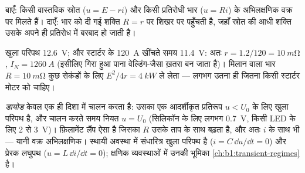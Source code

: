 \begin{omfigure}
\qquad
{}

{\small बाएँ: किसी वास्तविक स्रोत ($u = E - ri$) और किसी प्रतिरोधी भार
($u = Ri$) के अभिलक्षणिक वक्र  पर मिलते हैं। दाएँ: भार को दी गई
शक्ति $R = r$ पर शिखर पर पहुँचती है, जहाँ स्रोत की आधी शक्ति उसके अपने ही
प्रतिरोध में बरबाद हो जाती है।}
\end{omfigure}

\begin{example}[भार के नीचे कार की बैटरी]\label{ex:b1:dc-circuits:battery}
खुला परिपथ \qty{12.6}{V}; और स्टार्टर के \qty{120}{A} खींचते समय
\qty{11.4}{V}: अतः $r = 1.2/120 = \qty{10}{m\ohm}$, $I_N = \qty{1260}{A}$
(इसीलिए गिरा हुआ पाना वेल्डिंग-जैसा ख़तरा बन जाता है)। मिलान वाला भार
$R = \qty{10}{m\ohm}$ कुछ सेकंडों के लिए $E^2/4r = \qty{4}{kW}$ ले लेता
--- लगभग उतना ही जितना किसी स्टार्टर मोटर को चाहिए।
\end{example}

\begin{remark}[अन्य द्विसिरा]\label{rem:b1:dc-circuits:others}
\emph{डायोड} केवल एक ही दिशा में चालन करता है: उसका एक आदर्शीकृत प्रतिरूप
$u < U_0$ के लिए खुला परिपथ है, और चालन करते समय नियत  $u = U_0$
(सिलिकॉन के लिए लगभग \qty{0.7}{V}, किसी LED के लिए \qty{2}{} से
\qty{3}{V})। फ़िलामेंट लैंप ऐसा  है जिसका $R$ उसके ताप के साथ बढ़ता
है, और अतः $i$ के साथ भी --- यानी वक्र अभिलक्षणिक। स्थायी अवस्था में
संधारित्र खुला परिपथ है ($i = C\,\dd u/\dd t = 0$) और
प्रेरक लघुपथ ($u = L\,\dd i/\dd t = 0$); क्षणिक व्यवस्थाओं में उनकी भूमिका
\cref{ch:b1:transient-regimes} है।
\end{remark}

